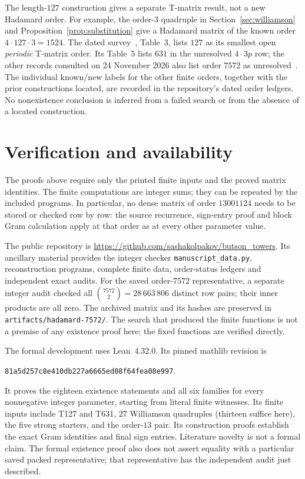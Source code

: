 \documentclass[10pt]{article}
\begin{document}
The length-$127$ construction gives a separate T-matrix result, not a
new Hadamard order. For example, the order-$3$ quadruple in
Section~\ref{sec:williamson} and Proposition~\ref{prop:substitution}
give a Hadamard matrix of the known order $4\cdot127\cdot3=1524$.
The dated survey~\cite{survey}, Table~3, lists $127$ as its smallest open
\emph{periodic} T-matrix order. Its Table~5 lists $631$ in the unresolved
$4\cdot3p$ row; the other records consulted on 24 November 2026 also
list order $7572$ as unresolved~\cite{explorer,frontier}.
The individual known/new labels for the other finite orders, together
with the prior constructions located, are recorded in the repository's
dated order ledgers. No nonexistence conclusion is inferred from a
failed search or from the absence of a located construction.

\section{Verification and availability}\label{sec:verification}

The proofs above require only the printed finite inputs and the proved
matrix identities. The finite computations are integer sums; they can
be repeated by the included programs. In particular, no dense matrix of
order $13001124$ needs to be stored or checked row by row: the source
recurrence, sign-entry proof and block Gram calculation apply at that
order as at every other parameter value.

The public repository is
\url{https://github.com/sashakolpakov/butson_towers}.
Its ancillary material provides the integer checker
\texttt{manuscript\_data.py}, reconstruction programs, complete finite
data, order-status ledgers and independent exact audits.
For the saved order-$7572$ representative, a separate integer audit
checked all $\binom{7572}{2}=28\,663\,806$ distinct row pairs; their
inner products are all zero. The archived matrix and its hashes are
preserved in \texttt{artifacts/hadamard-7572/}.
The search that produced the finite functions is not a premise of any
existence proof here; the fixed functions are verified directly.

The formal development uses Lean~4.32.0. Its pinned mathlib revision is
\begin{center}\small\texttt{81a5d257c8e410db227a6665ed08f64fea08e997}.\end{center}
It proves the eighteen existence statements and all six families for
every nonnegative integer parameter, starting from literal finite
witnesses. Its finite inputs include T127 and T631, $27$ Williamson
quadruples (thirteen suffice here), the five strong starters, and the
order-$13$ pair. Its construction proofs establish the exact Gram
identities and final sign entries. Literature novelty is not a formal
claim. The formal existence proof also does not assert equality with a
particular saved packed representative; that representative has the
independent audit just described.
\end{document}
